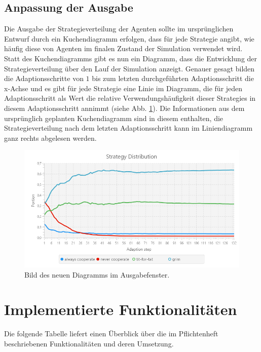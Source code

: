 \documentclass[parskip=full,11pt]{scrartcl}
\begin{document}
\subsection{Anpassung der Ausgabe}\label{outputmod}
Die Ausgabe der Strategieverteilung der Agenten sollte im ursprünglichen Entwurf durch ein Kuchendiagramm erfolgen, dass für jede Strategie angibt, wie häufig diese von Agenten im finalen Zustand der Simulation verwendet wird. Statt des Kuchendiagramms gibt es nun ein Diagramm, dass die Entwicklung der Strategieverteilung über den Lauf der Simulation anzeigt. Genauer gesagt bilden die Adaptionsschritte von \(1\) bis zum letzten durchgeführten Adaptionsschritt die x-Achse und es gibt für jede Strategie eine Linie im Diagramm, die für jeden Adaptionsschritt als Wert die relative Verwendungshäufigkeit dieser Strategies in diesem Adaptionsschritt annimmt (siehe Abb. \ref{fig:newoutput}). Die Informationen aus dem ursprünglich geplanten Kuchendiagramm sind in diesem enthalten, die Strategieverteilung nach dem letzten Adaptionsschritt kann im Liniendiagramm ganz rechts abgelesen werden.

\begin{figure}[h]
	\centering
	\includegraphics[width=\linewidth]{img/newoutput.png}
	\caption{Bild des neuen Diagramms im Ausgabefenster.}
	\label{fig:newoutput}
\end{figure}

\newpage
\section{Implementierte Funktionalitäten}
Die folgende Tabelle liefert einen Überblick über die im Pflichtenheft beschriebenen Funktionalitäten und deren Umsetzung.
\end{document}
